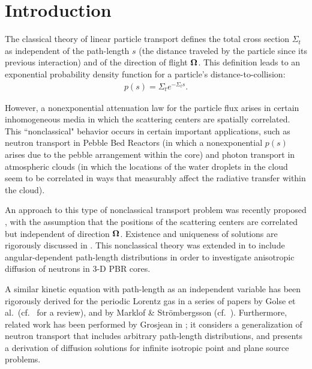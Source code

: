 \documentclass[12pt]{article}
\newcommand{\uomega}{{\bf \Omega}}
\begin{document}
\pagebreak

\doublespacing

\section{Introduction}

The classical theory of linear particle transport defines the total cross section $\Sigma_t$ as independent of the path-length $s$ (the distance traveled by the particle since its previous interaction) and of the direction of flight $\uomega$.
This definition leads to an exponential probability density function for a particle's distance-to-collision:
\begin{align}\label{eq1}
p(s) = \Sigma_t e^{-\Sigma_t s}.
\end{align}

However, a nonexponential attenuation law for the particle flux arises in certain inhomogeneous media in which the scattering centers are spatially correlated.
This ``nonclassical" behavior occurs in certain important applications, such as neutron transport in Pebble Bed Reactors (in which a nonexponential $p(s)$ arises due to the pebble arrangement within the core) and photon transport in atmospheric clouds (in which the locations of the water droplets in the cloud seem to be correlated in ways that measurably affect the radiative transfer within the cloud).

An approach to this type of nonclassical transport problem was recently proposed \cite{lar07,larvas11}, with the assumption that the positions of the scattering centers are correlated but independent of direction $\uomega$.
Existence and uniqueness of solutions are rigorously discussed in \cite{fra10}.
This nonclassical theory was extended in \cite{vaslar14a} to include angular-dependent path-length distributions in order to investigate anisotropic diffusion of neutrons in 3-D PBR cores.

A similar kinetic equation with path-length as an independent variable has been rigorously derived for the periodic Lorentz gas in a series of papers by Golse et al.~(cf.~\cite{gol12} for a review), and by Marklof \& Str\"ombergsson (cf.~\cite{mar11,mar15}).
Furthermore, related work has been performed by Grosjean in \cite{gro51}; it considers a generalization of neutron transport that includes arbitrary path-length distributions, and presents a derivation of diffusion solutions for infinite isotropic point and plane source problems.
 
\end{document}
